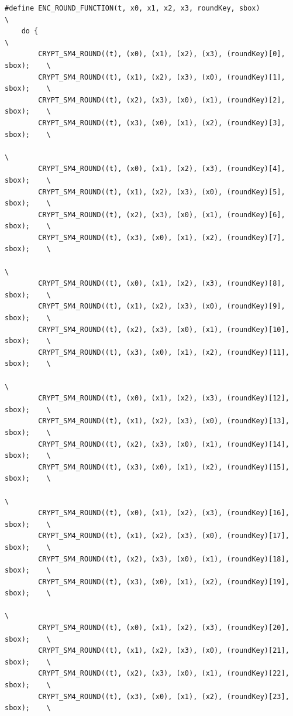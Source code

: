 \begin{lstlisting}[title={openhitls/crypto/sm4/src/crypt\_sm4.c}]
#define ENC_ROUND_FUNCTION(t, x0, x1, x2, x3, roundKey, sbox)                 \
    do {                                                                      \
        CRYPT_SM4_ROUND((t), (x0), (x1), (x2), (x3), (roundKey)[0],  sbox);    \
        CRYPT_SM4_ROUND((t), (x1), (x2), (x3), (x0), (roundKey)[1],  sbox);    \
        CRYPT_SM4_ROUND((t), (x2), (x3), (x0), (x1), (roundKey)[2],  sbox);    \
        CRYPT_SM4_ROUND((t), (x3), (x0), (x1), (x2), (roundKey)[3],  sbox);    \
                                                                              \
        CRYPT_SM4_ROUND((t), (x0), (x1), (x2), (x3), (roundKey)[4],  sbox);    \
        CRYPT_SM4_ROUND((t), (x1), (x2), (x3), (x0), (roundKey)[5],  sbox);    \
        CRYPT_SM4_ROUND((t), (x2), (x3), (x0), (x1), (roundKey)[6],  sbox);    \
        CRYPT_SM4_ROUND((t), (x3), (x0), (x1), (x2), (roundKey)[7],  sbox);    \
                                                                              \
        CRYPT_SM4_ROUND((t), (x0), (x1), (x2), (x3), (roundKey)[8],  sbox);    \
        CRYPT_SM4_ROUND((t), (x1), (x2), (x3), (x0), (roundKey)[9],  sbox);    \
        CRYPT_SM4_ROUND((t), (x2), (x3), (x0), (x1), (roundKey)[10], sbox);    \
        CRYPT_SM4_ROUND((t), (x3), (x0), (x1), (x2), (roundKey)[11], sbox);    \
                                                                              \
        CRYPT_SM4_ROUND((t), (x0), (x1), (x2), (x3), (roundKey)[12], sbox);    \
        CRYPT_SM4_ROUND((t), (x1), (x2), (x3), (x0), (roundKey)[13], sbox);    \
        CRYPT_SM4_ROUND((t), (x2), (x3), (x0), (x1), (roundKey)[14], sbox);    \
        CRYPT_SM4_ROUND((t), (x3), (x0), (x1), (x2), (roundKey)[15], sbox);    \
                                                                              \
        CRYPT_SM4_ROUND((t), (x0), (x1), (x2), (x3), (roundKey)[16], sbox);    \
        CRYPT_SM4_ROUND((t), (x1), (x2), (x3), (x0), (roundKey)[17], sbox);    \
        CRYPT_SM4_ROUND((t), (x2), (x3), (x0), (x1), (roundKey)[18], sbox);    \
        CRYPT_SM4_ROUND((t), (x3), (x0), (x1), (x2), (roundKey)[19], sbox);    \
                                                                              \
        CRYPT_SM4_ROUND((t), (x0), (x1), (x2), (x3), (roundKey)[20], sbox);    \
        CRYPT_SM4_ROUND((t), (x1), (x2), (x3), (x0), (roundKey)[21], sbox);    \
        CRYPT_SM4_ROUND((t), (x2), (x3), (x0), (x1), (roundKey)[22], sbox);    \
        CRYPT_SM4_ROUND((t), (x3), (x0), (x1), (x2), (roundKey)[23], sbox);    \

\end{lstlisting}
